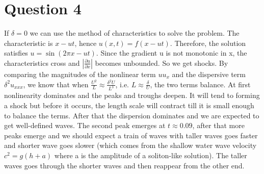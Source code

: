 \documentclass[a4paper,11pt]{article}
\begin{document}
\section{Question 4}
If $\delta = 0$ we can use the method of characteristics to solve the problem. The characteristic is $x-ut$, hence $u(x,t) = f(x-ut)$. Therefore, the solution satisfies $u = \sin(2\pi x-ut)$. Since the gradient u is not monotonic in x, the characteristics cross and $|\frac{\partial u}{\partial x}|$ becomes unbounded. So we get shocks. By comparing the magnitudes of the nonlinear term $uu_{x}$ and the dispersive term $\delta^2 u_{xxx}$, we know that when $\frac{U^2}{L} \approx \frac{\delta^2 U}{L^3}$, i.e. $L \approx \frac{\delta}{U}$, the two terms balance. At first nonlinearity dominates and the peaks and troughs deepen. It will tend to forming a shock but before it occurs, the length scale will contract till it is small enough to balance the terms. After that the dispersion dominates and we are expected to get well-defined waves. The second peak emerges at $t \approx 0.09$, after that more peaks emerge and we should expect a train of waves with taller waves goes faster and shorter wave goes slower (which comes from the shallow water wave velocity$c^2 = g(h+a)$ where a is the amplitude of a soliton-like solution). The taller waves goes through the shorter waves and then reappear from the other end. 
\end{document}
